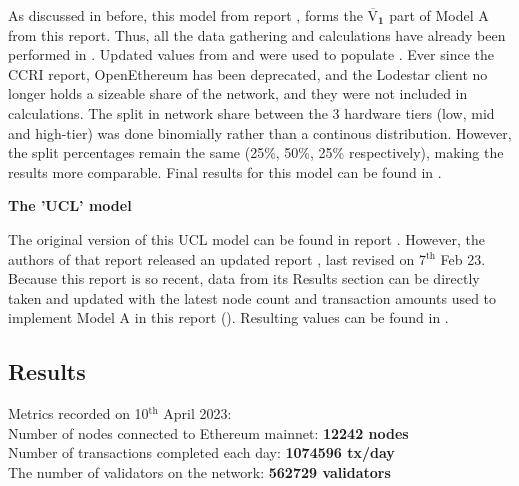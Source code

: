 As discussed in  before, this model from report \cite{CryptoCarbonRatingsInstitute2022TheNetwork}, forms the $ \boldsymbol{\overline{\mathrm{V}}_{1}}$ part of Model A from this report. Thus, all the data gathering and calculations have already been performed in . Updated values from  and  were used to populate . Ever since the CCRI report, OpenEthereum has been deprecated, and the Lodestar client no longer holds a sizeable share of the network, and they were not included in calculations.  The split in network share between the 3 hardware tiers (low, mid and high-tier) was done binomially rather than a continous distribution. However, the split percentages remain the same (25\%, 50\%, 25\% respectively), making the results more comparable. Final results for this model can be found in .

\textbf{The 'UCL' model} 

The original version of this UCL model can be found in report \cite{Platt2022TheProof-of-Work}. However, the authors of that report released an updated report \cite{IbanezTheExpansion}, last revised on 7$\mathrm{^{th}}$ Feb 23. Because this report is so recent, data from its Results section can be directly taken and updated with the latest node count and transaction amounts used to implement Model A in this report (). Resulting values can be found in . 


\subsection{Results}
\label{ResultsSection}
Metrics recorded on 10$\mathrm{^{th}}$ April 2023: \\
Number of nodes connected to Ethereum mainnet: \textbf{12242 nodes} \cite{NodewatchAnalytics} \\
Number of transactions completed each day: \textbf{1074596 tx/day}  \cite{EthereumBlockchair} \\
The number of validators on the network: \textbf{562729 validators} 
\cite{EthereumEthereum.orgc}

